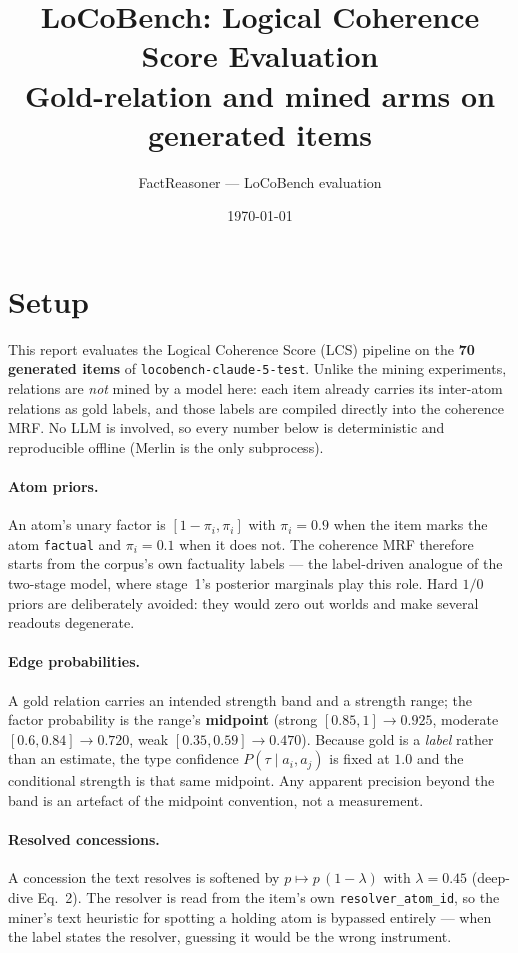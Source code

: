 \documentclass[11pt]{article}
\title{LoCoBench: Logical Coherence Score Evaluation\\
\large Gold-relation and mined arms on generated items}
\author{FactReasoner --- LoCoBench evaluation}
\date{\today}
\begin{document}
\maketitle

\section{Setup}

This report evaluates the Logical Coherence Score (LCS) pipeline on the \textbf{70 generated items} of \texttt{locobench-claude-5-test}. Unlike the mining experiments, relations are \emph{not} mined by a model here: each item already carries its inter-atom relations as gold labels, and those labels are compiled directly into the coherence MRF. No LLM is involved, so every number below is deterministic and reproducible offline (Merlin is the only subprocess).

\paragraph{Atom priors.} An atom's unary factor is $[1-\pi_i, \pi_i]$ with $\pi_i = 0.9$ when the item marks the atom \texttt{factual} and $\pi_i = 0.1$ when it does not. The coherence MRF therefore starts from the corpus's own factuality labels --- the label-driven analogue of the two-stage model, where stage~1's posterior marginals play this role. Hard $1/0$ priors are deliberately avoided: they would zero out worlds and make several readouts degenerate.

\paragraph{Edge probabilities.} A gold relation carries an intended strength band and a strength range; the factor probability is the range's \textbf{midpoint} (strong $[0.85,1] \to 0.925$, moderate $[0.6,0.84] \to 0.720$, weak $[0.35,0.59] \to 0.470$). Because gold is a \emph{label} rather than an estimate, the type confidence $P(\tau \mid a_i,a_j)$ is fixed at $1.0$ and the conditional strength is that same midpoint. Any apparent precision beyond the band is an artefact of the midpoint convention, not a measurement.

\paragraph{Resolved concessions.} A concession the text resolves is softened by $p \mapsto p\,(1-\lambda)$ with $\lambda = 0.45$ (deep-dive Eq.~2). The resolver is read from the item's own \texttt{resolver\_atom\_id}, so the miner's text heuristic for spotting a holding atom is bypassed entirely --- when the label states the resolver, guessing it would be the wrong instrument.
\end{document}

